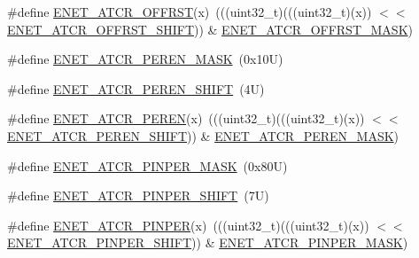 \begin{DoxyCompactItemize}
\item 
\#define \mbox{\hyperlink{group___e_n_e_t___register___masks_gae3f070e07d758da60799196c25741552}{E\+N\+E\+T\+\_\+\+A\+T\+C\+R\+\_\+\+O\+F\+F\+R\+ST}}(x)~(((uint32\+\_\+t)(((uint32\+\_\+t)(x)) $<$$<$ \mbox{\hyperlink{group___e_n_e_t___register___masks_gaeee97384c53d1b0f6cd3780fd1d2f1db}{E\+N\+E\+T\+\_\+\+A\+T\+C\+R\+\_\+\+O\+F\+F\+R\+S\+T\+\_\+\+S\+H\+I\+FT}})) \& \mbox{\hyperlink{group___e_n_e_t___register___masks_ga95712a56ae929380d83cd69b67781877}{E\+N\+E\+T\+\_\+\+A\+T\+C\+R\+\_\+\+O\+F\+F\+R\+S\+T\+\_\+\+M\+A\+SK}})
\item 
\#define \mbox{\hyperlink{group___e_n_e_t___register___masks_ga6c11ce9b10275a6765a5ede784b2bf1f}{E\+N\+E\+T\+\_\+\+A\+T\+C\+R\+\_\+\+P\+E\+R\+E\+N\+\_\+\+M\+A\+SK}}~(0x10\+U)
\item 
\#define \mbox{\hyperlink{group___e_n_e_t___register___masks_gaa3174823ddaff2166b78849f64a51785}{E\+N\+E\+T\+\_\+\+A\+T\+C\+R\+\_\+\+P\+E\+R\+E\+N\+\_\+\+S\+H\+I\+FT}}~(4\+U)
\item 
\#define \mbox{\hyperlink{group___e_n_e_t___register___masks_ga1091496fd32993d910d709d8c414f529}{E\+N\+E\+T\+\_\+\+A\+T\+C\+R\+\_\+\+P\+E\+R\+EN}}(x)~(((uint32\+\_\+t)(((uint32\+\_\+t)(x)) $<$$<$ \mbox{\hyperlink{group___e_n_e_t___register___masks_gaa3174823ddaff2166b78849f64a51785}{E\+N\+E\+T\+\_\+\+A\+T\+C\+R\+\_\+\+P\+E\+R\+E\+N\+\_\+\+S\+H\+I\+FT}})) \& \mbox{\hyperlink{group___e_n_e_t___register___masks_ga6c11ce9b10275a6765a5ede784b2bf1f}{E\+N\+E\+T\+\_\+\+A\+T\+C\+R\+\_\+\+P\+E\+R\+E\+N\+\_\+\+M\+A\+SK}})
\item 
\#define \mbox{\hyperlink{group___e_n_e_t___register___masks_ga77bb996851465816022bc4775156bcfc}{E\+N\+E\+T\+\_\+\+A\+T\+C\+R\+\_\+\+P\+I\+N\+P\+E\+R\+\_\+\+M\+A\+SK}}~(0x80\+U)
\item 
\#define \mbox{\hyperlink{group___e_n_e_t___register___masks_ga132378b49192464e6f7f3246b9c07d11}{E\+N\+E\+T\+\_\+\+A\+T\+C\+R\+\_\+\+P\+I\+N\+P\+E\+R\+\_\+\+S\+H\+I\+FT}}~(7\+U)
\item 
\#define \mbox{\hyperlink{group___e_n_e_t___register___masks_ga7c098de31ee5e0aa1ed308f974c02d6b}{E\+N\+E\+T\+\_\+\+A\+T\+C\+R\+\_\+\+P\+I\+N\+P\+ER}}(x)~(((uint32\+\_\+t)(((uint32\+\_\+t)(x)) $<$$<$ \mbox{\hyperlink{group___e_n_e_t___register___masks_ga132378b49192464e6f7f3246b9c07d11}{E\+N\+E\+T\+\_\+\+A\+T\+C\+R\+\_\+\+P\+I\+N\+P\+E\+R\+\_\+\+S\+H\+I\+FT}})) \& \mbox{\hyperlink{group___e_n_e_t___register___masks_ga77bb996851465816022bc4775156bcfc}{E\+N\+E\+T\+\_\+\+A\+T\+C\+R\+\_\+\+P\+I\+N\+P\+E\+R\+\_\+\+M\+A\+SK}})
$$
\end{DoxyCompactItemize}
